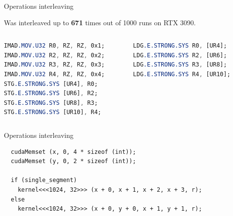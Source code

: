 \documentclass[aspectratio=169,compress]{beamer}
\begin{document}
\begin{frame}[fragile]{Operations interleaving}{}

Was interleaved up to \textbf{671} times out of 1000 runs on RTX 3090.

\begin{columns}[T]
	\begin{column}{0.4\textwidth}
		\begin{lstlisting}[title={Writer},language={SASS}]
IMAD.MOV.U32 R0, RZ, RZ, 0x1;
IMAD.MOV.U32 R2, RZ, RZ, 0x2;
IMAD.MOV.U32 R3, RZ, RZ, 0x3;
IMAD.MOV.U32 R4, RZ, RZ, 0x4;
STG.E.STRONG.SYS [UR4], R0;
STG.E.STRONG.SYS [UR6], R2;
STG.E.STRONG.SYS [UR8], R3;
STG.E.STRONG.SYS [UR10], R4;
\end{lstlisting}
\end{column}

\begin{column}{0.45\textwidth}
\begin{lstlisting}[title={Reader},language={SASS}]
LDG.E.STRONG.SYS R0, [UR4];
LDG.E.STRONG.SYS R2, [UR6];
LDG.E.STRONG.SYS R3, [UR8];
LDG.E.STRONG.SYS R4, [UR10];
\end{lstlisting}
			\end{column}
	\end{columns}

\end{frame}

\begin{frame}[fragile]{Operations interleaving}{}
\centering
\begin{lstlisting}
  cudaMemset (x, 0, 4 * sizeof (int));
  cudaMemset (y, 0, 2 * sizeof (int));

  if (single_segment)
    kernel<<<1024, 32>>> (x + 0, x + 1, x + 2, x + 3, r);
  else
    kernel<<<1024, 32>>> (x + 0, y + 0, x + 1, y + 1, r);
\end{lstlisting}
\end{frame}
\end{document}
